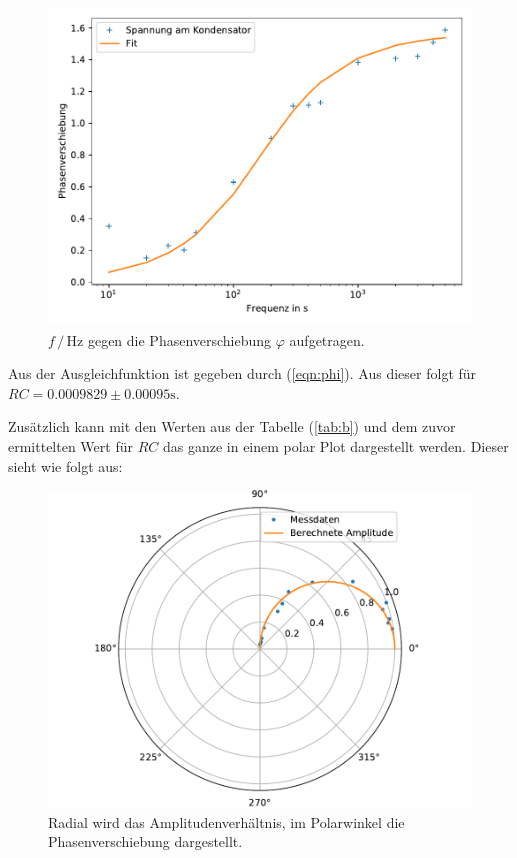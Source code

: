     \begin{figure}
        \centering
        \includegraphics[width=\textwidth]{Daten/c.pdf}
        \caption{$f \, / \, \si{\hertz}$ gegen die Phasenverschiebung $\varphi$ aufgetragen.}
    \end{figure}
    
    Aus der Ausgleichfunktion ist gegeben durch (\ref{eqn:phi}). Aus dieser folgt für $RC = 0.0009829 \pm 0.00095 \si{\second}$.

    Zusätzlich kann mit den Werten aus der Tabelle (\ref{tab:b}) und dem zuvor ermittelten Wert für $RC$ das ganze in einem polar Plot dargestellt werden. Dieser sieht wie folgt aus:

    \begin{figure}
        \centering
        \includegraphics[width=\textwidth]{Daten/d.pdf}
        \caption{Radial wird das Amplitudenverhältnis, im Polarwinkel die Phasenverschiebung dargestellt.}
    \end{figure}
\newpage
